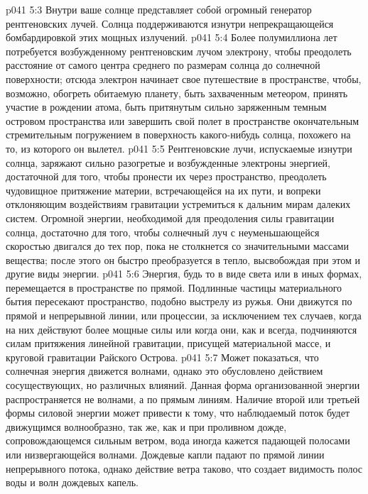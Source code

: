 \vs p041 5:3 Внутри ваше солнце представляет собой огромный генератор рентгеновских лучей. Солнца поддерживаются изнутри непрекращающейся бомбардировкой этих мощных излучений.
\vs p041 5:4 Более полумиллиона лет потребуется возбужденному рентгеновским лучом электрону, чтобы преодолеть расстояние от самого центра среднего по размерам солнца до солнечной поверхности; отсюда электрон начинает свое путешествие в пространстве, чтобы, возможно, обогреть обитаемую планету, быть захваченным метеором, принять участие в рождении атома, быть притянутым сильно заряженным темным островом пространства или завершить свой полет в пространстве окончательным стремительным погружением в поверхность какого\hyp{}нибудь солнца, похожего на то, из которого он вылетел.
\vs p041 5:5 Рентгеновские лучи, испускаемые изнутри солнца, заряжают сильно разогретые и возбужденные электроны энергией, достаточной для того, чтобы пронести их через пространство, преодолеть чудовищное притяжение материи, встречающейся на их пути, и вопреки отклоняющим воздействиям гравитации устремиться к дальним мирам далеких систем. Огромной энергии, необходимой для преодоления силы гравитации солнца, достаточно для того, чтобы солнечный луч с неуменьшающейся скоростью двигался до тех пор, пока не столкнется со значительными массами вещества; после этого он быстро преобразуется в тепло, высвобождая при этом и другие виды энергии.
\vs p041 5:6 \pc Энергия, будь то в виде света или в иных формах, перемещается в пространстве по прямой. Подлинные частицы материального бытия пересекают пространство, подобно выстрелу из ружья. Они движутся по прямой и непрерывной линии, или процессии, за исключением тех случаев, когда на них действуют более мощные силы или когда они, как и всегда, подчиняются силам притяжения линейной гравитации, присущей материальной массе, и круговой гравитации Райского Острова.
\vs p041 5:7 \pc Может показаться, что солнечная энергия движется волнами, однако это обусловлено действием сосуществующих, но различных влияний. Данная форма организованной энергии распространяется не волнами, а по прямым линиям. Наличие второй или третьей формы силовой энергии может привести к тому, что наблюдаемый поток будет  движущимся волнообразно, так же, как и при проливном дожде, сопровождающемся сильным ветром, вода иногда кажется падающей полосами или низвергающейся волнами. Дождевые капли падают по прямой линии непрерывного потока, однако действие ветра таково, что создает видимость полос воды и волн дождевых капель.
